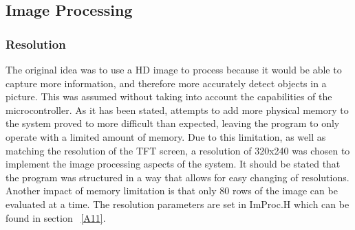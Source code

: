\subsection{Image Processing}
\subsubsection{Resolution}
The original idea was to use a HD image to process because it would be able to capture more information, and therefore more accurately detect objects in a picture. This was assumed without taking into account the capabilities of the microcontroller. As it has been stated, attempts to add more physical memory to the system proved to more difficult than expected, leaving the program to only operate with a limited amount of memory. Due to this limitation, as well as matching the resolution of the TFT screen, a resolution of 320x240 was chosen to implement the image processing aspects of the system. It should be stated that the program was structured in a way that allows for easy changing of resolutions. Another impact of memory limitation is that only 80 rows of the image can be evaluated at a time. The resolution parameters are set in ImProc.H which can be found in section ~\ref{A11}.\\

